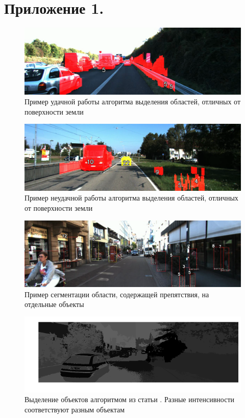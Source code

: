\documentclass[aps,%
14pt,%
final,%
oneside,
onecolumn,%
musixtex, %
superscriptaddress,%
centertags]{extarticle} %
\begin{document}
\newpage
\section{Приложение 1.}
\begin{figure}[h]
     \includegraphics[width=\textwidth]{basic_vdisparity_good.png}
     \caption{Пример удачной работы алгоритма выделения областей, отличных от поверхности земли }
     \label{fig:basic_vdisparity_good}
\end{figure}
\begin{figure}[]
     \includegraphics[width=\textwidth]{basic_vdisparity.png}
     \caption{Пример неудачной работы алгоритма выделения областей, отличных от поверхности земли }
     \label{fig:basic_vdisparity}
\end{figure}
\begin{figure}[]
     \includegraphics[width=\textwidth]{stixel_boxes.png}
     \caption{Пример сегментации области, содержащей препятствия, на отдельные объекты }
     \label{fig:stixel_boxes}
\end{figure}
\begin{figure}[]
     \includegraphics[width=\textwidth]{download.png}
     \caption{Выделение объектов алгоритмом из статьи \cite{franke20056d}. Разные интенсивности соответствуют разным объектам}
     \label{fig:6d}
\end{figure}
\end{document}
